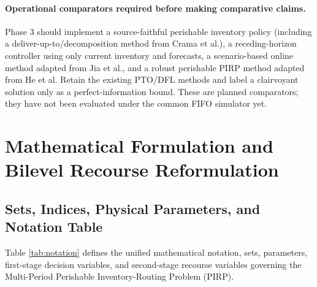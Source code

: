 \documentclass[11pt,a4paper]{article}
\theoremstyle{definition}
\theoremstyle{remark}
\begin{document}
\paragraph{Operational comparators required before making comparative claims.}
Phase 3 should implement a source-faithful perishable inventory policy (including a deliver-up-to/decomposition method from Crama et al.), a receding-horizon controller using only current inventory and forecasts, a scenario-based online method adapted from Jia et al., and a robust perishable PIRP method adapted from He et al. Retain the existing PTO/DFL methods and label a clairvoyant solution only as a perfect-information bound. These are planned comparators; they have not been evaluated under the common FIFO simulator yet.

\section{Mathematical Formulation and Bilevel Recourse Reformulation}
\label{sec:formulation}

\subsection{Sets, Indices, Physical Parameters, and Notation Table}
\label{subsec:notation}
Table \ref{tab:notation} defines the unified mathematical notation, sets, parameters, first-stage decision variables, and second-stage recourse variables governing the Multi-Period Perishable Inventory-Routing Problem (PIRP).
\end{document}
